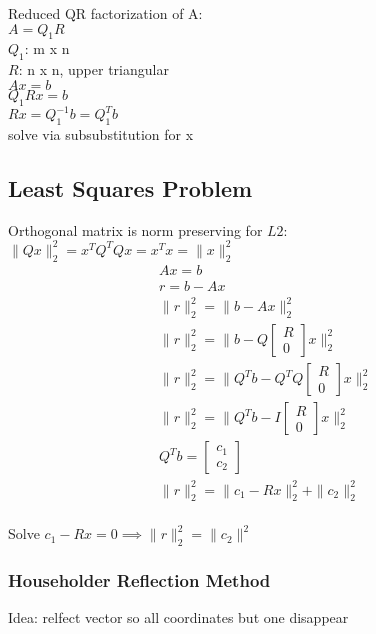 \documentclass[8pt,letter]{article}
\begin{document}
\begin{multicols*}{2}
    Reduced QR factorization of A:\\
    $A = Q_1 R$\\
    $Q_1$: m x n\\
    $R$: n x n, upper triangular\\

    $Ax = b$\\
    $Q_1 R x = b$\\
    $Rx = Q_1^{-1} b = Q_1^T b$\\
    solve via subsubstitution for x\\

    \subsection{Least Squares Problem}
    Orthogonal matrix is norm preserving for $L2$:\\
    $\|Qx\|_2^2 = x^T Q^T Q x = x^T x = \|x\|_2^2$
    \begin{align*}
      & Ax=b\\
      & r = b-Ax\\
      & \|r\|_2^2 = \|b-Ax\|_2^2\\
      & \|r\|_2^2 = \|b-Q \begin{bmatrix} R \\ 0\end{bmatrix}x\|_2^2\\
      & \|r\|_2^2 = \|Q^Tb - Q^T Q \begin{bmatrix} R \\ 0\end{bmatrix}x\|_2^2\\
      & \|r\|_2^2 = \|Q^Tb - I\begin{bmatrix} R \\ 0\end{bmatrix}x\|_2^2\\
      & Q^T b = \begin{bmatrix} c_1 \\ c_2 \end{bmatrix}\\
      & \|r\|_2^2 = \|c_1 - Rx\|_2^2 + \|c_2\|_2^2\\
    \end{align*}

    Solve $c_1 - Rx=0 \implies \|r\|_2^2 = \|c_2\|^2$

    \vfill\null
    \columnbreak
        
    \subsubsection{Householder Reflection Method}
    Idea: relfect vector so all coordinates but one disappear\\


\end{multicols*}
\end{document}
